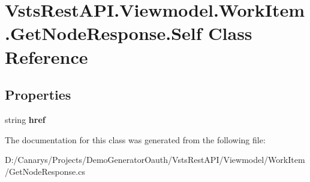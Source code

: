 \hypertarget{class_vsts_rest_a_p_i_1_1_viewmodel_1_1_work_item_1_1_get_node_response_1_1_self}{}\section{Vsts\+Rest\+A\+P\+I.\+Viewmodel.\+Work\+Item.\+Get\+Node\+Response.\+Self Class Reference}
\label{class_vsts_rest_a_p_i_1_1_viewmodel_1_1_work_item_1_1_get_node_response_1_1_self}
\subsection*{Properties}
\begin{DoxyCompactItemize}
\item 
\mbox{\label{class_vsts_rest_a_p_i_1_1_viewmodel_1_1_work_item_1_1_get_node_response_1_1_self_a62c9e0727248025b45031fb4c7bab4ac}} 
string {\bfseries href}
\end{DoxyCompactItemize}


The documentation for this class was generated from the following file\+:\begin{DoxyCompactItemize}
\item 
D\+:/\+Canarys/\+Projects/\+Demo\+Generator\+Oauth/\+Vsts\+Rest\+A\+P\+I/\+Viewmodel/\+Work\+Item/Get\+Node\+Response.\+cs\end{DoxyCompactItemize}
